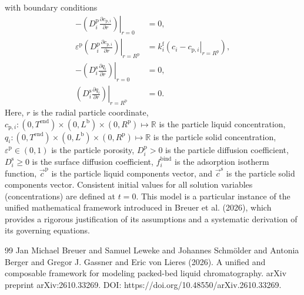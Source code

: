 \documentclass{article}
\begin{document}
with boundary conditions
\begin{align}
    - \left. \left( D^{\mathrm{p}}_{i} \frac{\partial c_{\mathrm{p},i}}{\partial r} \right) \right|_{r=0}
    &= 0,
    \\
    \varepsilon^{\mathrm{p}} \left. \left( D^{\mathrm{p}}_{i} \frac{\partial c_{\mathrm{p},i}}{\partial r} \right)\right|_{r = R^{\mathrm{p}}}
    &= k^{\mathrm{f}}_{i} \left. \left( c_{i} - c_{\mathrm{p},i} \right|_{r = R^{\mathrm{p}}} \right),
    \\
    - \left( \left. D^{\mathrm{s}}_{i} \frac{\partial q_{i}}{\partial r} \right) \right|_{r=0}
    &= 0,
    \\
    \left( \left. D^{\mathrm{s}}_{i} \frac{\partial q_{i}}{\partial r} \right) \right|_{r = R^{\mathrm{p}}}
    &= 0.
\end{align}
Here, $r$ is the radial particle coordinate, $c_{\mathrm{p},i}\colon (0, T^{\mathrm{end}}) \times (0, L^{\mathrm{b}})\times (0, R^{\mathrm{p}}) \mapsto \mathbb{R}$ is the particle liquid concentration, $q_{i}\colon (0, T^{\mathrm{end}}) \times (0, L^{\mathrm{b}})\times (0, R^{\mathrm{p}}) \mapsto \mathbb{R}$ is the particle solid concentration, $\varepsilon^{\mathrm{p}}\in (0, 1)$ is the particle porosity, $D^{\mathrm{p}}_{i}> 0$ is the particle diffusion coefficient, $D^{\mathrm{s}}_{i}\geq 0$ is the surface diffusion coefficient, $f^{\mathrm{bind}}_{i}$ is the adsorption isotherm function, $\vec{c}^{\mathrm{p}}$ is the particle liquid components vector, and $\vec{c}^{\mathrm{s}}$ is the particle solid components vector.
Consistent initial values for all solution variables (concentrations) are defined at $t = 0$.
This model is a particular instance of the unified mathematical framework introduced in Breuer et al. (2026), which provides a rigorous justification of its assumptions and a systematic derivation of its governing equations.
\begin{thebibliography}{99}
     Jan Michael Breuer and Samuel Leweke and Johannes Schmölder and Antonia Berger and Gregor J. Gassner and Eric von Lieres (2026). A unified and composable framework for modeling packed-bed liquid chromatography. arXiv preprint arXiv:2610.33269. DOI: https://doi.org/10.48550/arXiv.2610.33269.
\end{thebibliography}
\end{document}

